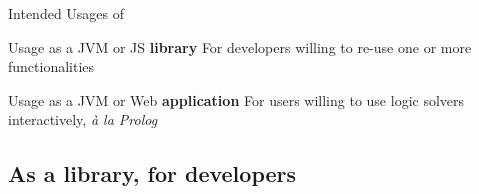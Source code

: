 \documentclass[handout]{beamer}
\begin{document}
\begin{frame}{Intended Usages of \twopkt{}}
    \begin{block}{Usage as a JVM or JS \textbf{library}}
        \centering
        For \alert{developers} willing to re-use one or more functionalities
    \end{block}
    
    \vfill

    \begin{block}{Usage as a JVM or Web \textbf{application}}
        \centering
        For \alert{users} willing to use logic solvers interactively, \emph{à la Prolog}
    \end{block}

\end{frame}

\subsection{As a library, for developers}
\end{document}

